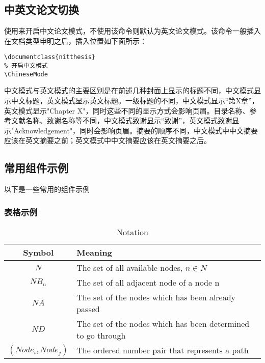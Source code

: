\documentclass{nitthesis}
\begin{document}
\subsection{中英文论文切换}

使用来开启中文论文模式，不使用该命令则默认为英文论文模式。该命令一般插入在文档类型申明之后，插入位置如下面所示：

\begin{lstlisting}
\documentclass{nitthesis}
% 开启中文模式
\ChineseMode
\end{lstlisting}

中文模式与英文模式的主要区别是在前述几种封面上显示的标题不同，中文模式显示中文标题，英文模式显示英文标题。一级标题的不同，中文模式显示“第X章”，英文模式显示"Chapter X"，同时这些不同的显示方式会影响页眉。目录名称、参考文献名称、致谢名称等不同，中文模式致谢显示“致谢”，英文模式致谢显示"Acknowledgement"，同时会影响页眉。摘要的顺序不同，中文模式中中文摘要应该在英文摘要之前；英文模式中中文摘要应该在英文摘要之后。

\subsection{常用组件示例}

以下是一些常用的组件示例

\subsubsection{表格示例}

\begin{table}[H]
    \centering
    \caption{Notation}
    \label{table.example}
    \begin{tabular}{cp{12cm}}
        \toprule
        \centering
        \textbf{Symbol}    & \textbf{Meaning}                                                                             \\
        \midrule
        $N$                & The set of all available nodes, $n \in N$                                                    \\
        $NB_n$             & The set of all adjacent node of a node n                                                     \\
        $NA$               & The set of the nodes which has been already passed                                           \\
        $ND$               & The set of the nodes which has been determined to go through                                 \\
        $(Node_i, Node_j)$ & The ordered number pair that represents a path                                               \\
        \bottomrule
    \end{tabular}
\end{table}
\end{document}
